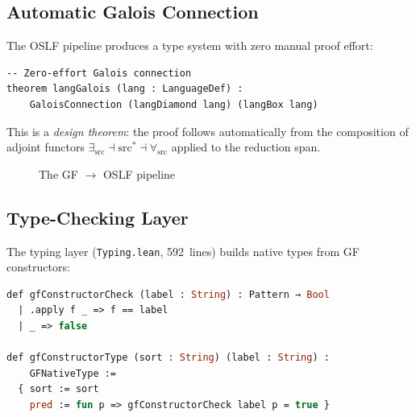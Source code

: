 \documentclass[11pt]{article}
\newcommand{\code}[1]{\texttt{#1}}
\newcommand{\Dia}{\ensuremath{\diamondsuit}}
\newcommand{\Bx}{\ensuremath{\blacksquare}}
\newcommand{\OSLF}{\textup{OSLF}}
\newcommand{\GF}{\textup{GF}}
\begin{document}
\subsection{Automatic Galois Connection}

The \OSLF{} pipeline produces a type system with zero manual proof effort:
\begin{lstlisting}[language=ml,caption={Automatic type system construction}]
-- Zero-effort Galois connection
theorem langGalois (lang : LanguageDef) :
    GaloisConnection (langDiamond lang) (langBox lang)
\end{lstlisting}

This is a \emph{design theorem}: the proof follows automatically from the
composition of adjoint functors $\exists_{\text{src}} \dashv
\text{src}^* \dashv \forall_{\text{src}}$ applied to the reduction span.

\begin{figure}[ht]
\centering
{}
\caption{The GF $\to$ OSLF pipeline}
\label{fig:pipeline}
\end{figure}

\subsection{Type-Checking Layer}

The typing layer (\code{Typing.lean}, 592~lines) builds native types from
\GF{} constructors:

\begin{lstlisting}[language=ml,caption={Constructor-based native types}]
def gfConstructorCheck (label : String) : Pattern → Bool
  | .apply f _ => f == label
  | _ => false

def gfConstructorType (sort : String) (label : String) :
    GFNativeType :=
  { sort := sort
    pred := fun p => gfConstructorCheck label p = true }
\end{lstlisting}
\end{document}
